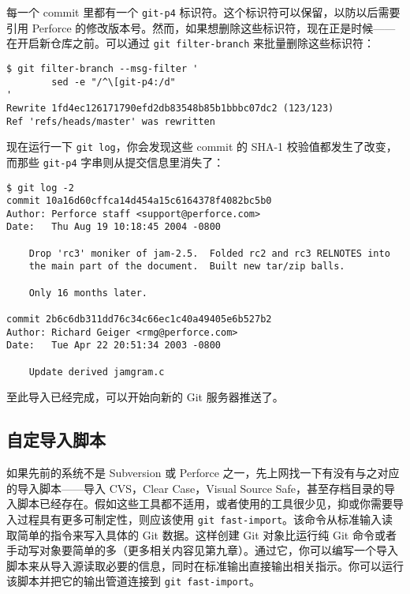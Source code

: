 \documentclass[a4paper]{book}
\begin{document}
每一个 commit 里都有一个 \texttt{git-p4} 标识符。这个标识符可以保留，以防以后需要引用 Perforce 的修改版本号。然而，如果想删除这些标识符，现在正是时候------在开启新仓库之前。可以通过 \texttt{git filter-branch} 来批量删除这些标识符：

\begin{shaded}\begin{verbatim}
$ git filter-branch --msg-filter '
        sed -e "/^\[git-p4:/d"
'
Rewrite 1fd4ec126171790efd2db83548b85b1bbbc07dc2 (123/123)
Ref 'refs/heads/master' was rewritten
\end{verbatim}\end{shaded}

现在运行一下 \texttt{git log}，你会发现这些 commit 的 SHA-1 校验值都发生了改变，而那些 \texttt{git-p4} 字串则从提交信息里消失了：

\begin{shaded}\begin{verbatim}
$ git log -2
commit 10a16d60cffca14d454a15c6164378f4082bc5b0
Author: Perforce staff <support@perforce.com>
Date:   Thu Aug 19 10:18:45 2004 -0800

    Drop 'rc3' moniker of jam-2.5.  Folded rc2 and rc3 RELNOTES into
    the main part of the document.  Built new tar/zip balls.

    Only 16 months later.

commit 2b6c6db311dd76c34c66ec1c40a49405e6b527b2
Author: Richard Geiger <rmg@perforce.com>
Date:   Tue Apr 22 20:51:34 2003 -0800

    Update derived jamgram.c
\end{verbatim}\end{shaded}

至此导入已经完成，可以开始向新的 Git 服务器推送了。

\subsection{自定导入脚本}

如果先前的系统不是 Subversion 或 Perforce 之一，先上网找一下有没有与之对应的导入脚本------导入 CVS，Clear Case，Visual Source Safe，甚至存档目录的导入脚本已经存在。假如这些工具都不适用，或者使用的工具很少见，抑或你需要导入过程具有更多可制定性，则应该使用 \texttt{git fast-import}。该命令从标准输入读取简单的指令来写入具体的 Git 数据。这样创建 Git 对象比运行纯 Git 命令或者手动写对象要简单的多（更多相关内容见第九章）。通过它，你可以编写一个导入脚本来从导入源读取必要的信息，同时在标准输出直接输出相关指示。你可以运行该脚本并把它的输出管道连接到 \texttt{git fast-import}。
\end{document}
